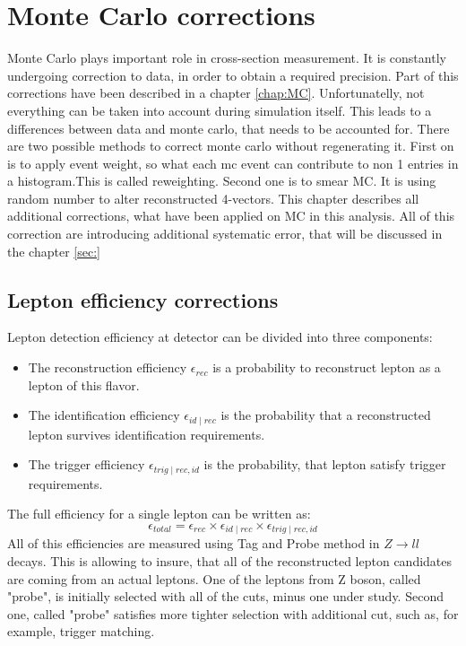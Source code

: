\chapter{Monte Carlo corrections}
Monte Carlo plays important role in cross-section measurement. It is constantly undergoing correction to data, in order to obtain a required precision. Part of this corrections have been described in a chapter \ref{chap:MC}. Unfortunatelly,  not everything can be taken into account during simulation itself. This leads to a differences between data and monte carlo, that needs to be accounted for. There are two possible methods to correct monte carlo without regenerating it. First on is to apply event weight, so what each mc event can contribute to non 1 entries in a histogram.This is called reweighting. Second one is to smear MC. It is using random number to alter reconstructed 4-vectors. 
This chapter describes all additional corrections, what have been applied on MC in this analysis. All of this correction are introducing additional systematic error, that will be discussed in the chapter \ref{sec:}

\section{Lepton efficiency corrections}

Lepton detection efficiency at \atlas detector can be divided into three components:
\begin{itemize}
\item The reconstruction efficiency $\epsilon_{rec}$ is a probability to reconstruct lepton as a lepton of this flavor.
\item The identification efficiency $\epsilon_{id \mid rec}$ is the probability that a reconstructed lepton survives  identification requirements. 
\item The trigger efficiency $\epsilon_{trig \mid rec,id}$ is the probability, that lepton satisfy trigger requirements. 
\end{itemize}
The full efficiency for a single lepton can be written as:
\begin{equation}
\epsilon_{total}=\epsilon_{rec} \times \epsilon_{id \mid rec} \times \epsilon_{trig \mid rec,id}
\end{equation}
All of this efficiencies are measured using Tag and Probe method in $Z\to ll$ decays. This is allowing to insure, that all of the reconstructed lepton candidates are coming from an actual leptons. One of the leptons from Z boson, called "probe", is initially selected with all of the cuts, minus one under study. Second one, called "probe" satisfies more tighter selection with additional cut, such as, for example, trigger matching.


